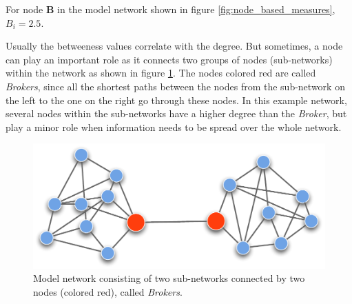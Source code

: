 For node \textbf{B} in the model network shown in figure \ref{fig:node_based_measures}, $B_i = 2.5$.

Usually the betweeness values correlate with the degree. But sometimes, a node can play an important role as it connects two groups of nodes (sub-networks) within the network as shown in figure \ref{fig:broker}. The nodes colored red are called \textit{Brokers}\citep{lusseau:04}, since all the shortest paths between the nodes from the sub-network on the left to the one on the right go through these nodes. In this example network, several nodes within the sub-networks have a higher degree than the \textit{Broker}, but play a minor role when information needs to be spread over the whole network.   

\begin{figure}[htpb]
\begin{center}
  \includegraphics[width=.75\textwidth]{assets/pdf/broker.pdf}
  \caption[Model network consisting of two sub-networks]{Model network consisting of two sub-networks connected by two nodes (colored red), called \textit{Brokers}.}
  \label{fig:broker}
\end{center}
\end{figure}
% 
% 
% 
% 
% 
% 	 

